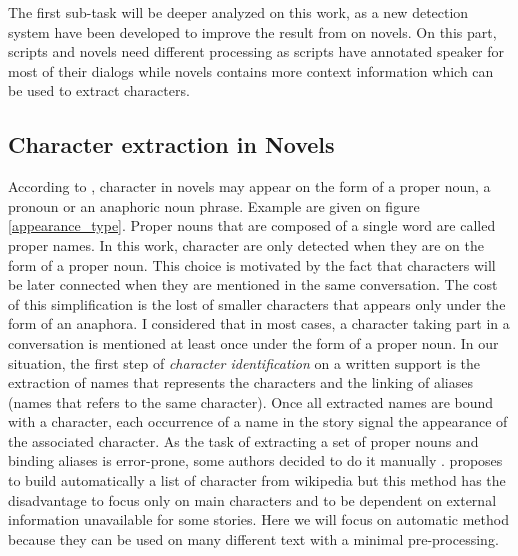 \documentclass[a4paper, 12pt]{report}
\begin{document}
The first sub-task will be deeper analyzed on this work, as a new detection system have been developed to improve the result from \cite{original} on novels. On this part, scripts and novels need different processing as scripts have annotated speaker for most of their dialogs while novels contains more context information which can be used to extract characters.  


\subsection{Character extraction in Novels}
According to \cite{fiction},  character in novels may appear on the form of a proper noun, a pronoun or an anaphoric noun phrase. Example are given on figure \ref{appearance_type}. Proper nouns that are composed of a single word are called proper names. In this work, character are only detected when they are on the form of a proper noun. This choice is motivated by the fact that characters will be later connected when they are mentioned in the same conversation. The cost of this simplification is the lost of smaller characters that appears only under the form of an anaphora. I considered that in most cases, a character taking part in a conversation is mentioned at least once under the form of a proper noun. In our situation, the first step of \textit{character identification} on a written support is the extraction of names that represents the characters and the linking of aliases (names that refers to the same character). Once all extracted names are bound with a character, each occurrence of a name in the story signal the appearance of the associated character. As the task of extracting a set of proper nouns and binding aliases is error-prone, some authors decided to do it manually \citep{agarwal-etal-2013-automatic}.  \cite{he-etal-2013-identification} proposes to build automatically a list of character from wikipedia but this method has the disadvantage to focus only on main characters and to be dependent on external information unavailable for some stories.  Here we will focus on automatic method because they can be used on many different text with a minimal pre-processing.\\

\begin{table}
\center
{}\\
\caption{Different type of characters appearance}\label{appearance_type}
\end{table}
\end{document}
